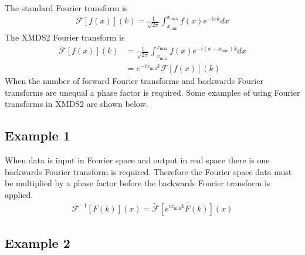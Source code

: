 \documentclass[letterpaper,10pt,english]{sphinxmanual}
\begin{document}
\sphinxAtStartPar
The standard Fourier transform is
\begin{equation*}
\begin{split}\mathcal{F}\left[f(x)\right](k) = \frac{1}{\sqrt{2\pi}}\int_{x_\text{min}}^{x_\text{max}} f(x) e^{-i x k} dx\end{split}
\end{equation*}
\sphinxAtStartPar
The XMDS2 Fourier transform is
\begin{equation*}
\begin{split}\tilde{\mathcal{F}}\left[f(x)\right](k) &= \frac{1}{\sqrt{2\pi}}\int_{x_\text{min}}^{x_\text{max}} f(x) e^{-i (x+ x_\text{min}) k} dx \\
&= e^{-i x_\text{min} k} \mathcal{F}\left[f(x)\right](k)\end{split}
\end{equation*}
\sphinxAtStartPar
When the number of forward Fourier transforms and backwards Fourier transforms are unequal a phase factor is required. Some examples of using Fourier transforms in XMDS2 are shown below.


\subsection{Example 1}
\label{\detokenize{advanced_topics:example-1}}

\sphinxAtStartPar
When data is input in Fourier space and output in real space there is one backwards Fourier transform is required. Therefore the Fourier space data must be multiplied by a phase factor before the backwards Fourier transform is applied.
\begin{equation*}
\begin{split}\mathcal{F}^{-1}[F(k)](x) = \tilde{\mathcal{F}}[e^{i x_\text{min} k} F(k)](x)\end{split}
\end{equation*}

\subsection{Example 2}
\label{\detokenize{advanced_topics:example-2}}
\end{document}
